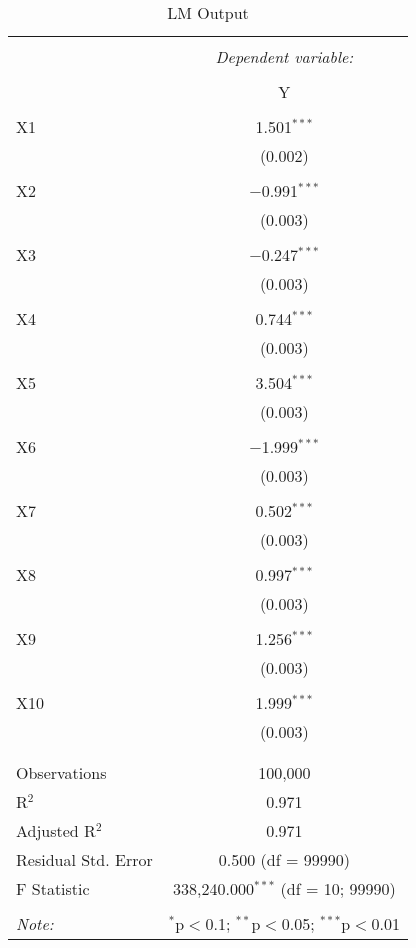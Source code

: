 \documentclass{article}
\begin{document}
\begin{table}[!htbp] \centering 
  \caption{LM Output} 
  \label{} 
\begin{tabular}{@{\extracolsep{5pt}}lc} 
\\[-1.8ex]\hline 
\hline \\[-1.8ex] 
 & \multicolumn{1}{c}{\textit{Dependent variable:}} \\ 
\cline{2-2} 
\\[-1.8ex] & Y \\ 
\hline \\[-1.8ex] 
 X1 & 1.501$^{***}$ \\ 
  & (0.002) \\ 
  & \\ 
 X2 & $-$0.991$^{***}$ \\ 
  & (0.003) \\ 
  & \\ 
 X3 & $-$0.247$^{***}$ \\ 
  & (0.003) \\ 
  & \\ 
 X4 & 0.744$^{***}$ \\ 
  & (0.003) \\ 
  & \\ 
 X5 & 3.504$^{***}$ \\ 
  & (0.003) \\ 
  & \\ 
 X6 & $-$1.999$^{***}$ \\ 
  & (0.003) \\ 
  & \\ 
 X7 & 0.502$^{***}$ \\ 
  & (0.003) \\ 
  & \\ 
 X8 & 0.997$^{***}$ \\ 
  & (0.003) \\ 
  & \\ 
 X9 & 1.256$^{***}$ \\ 
  & (0.003) \\ 
  & \\ 
 X10 & 1.999$^{***}$ \\ 
  & (0.003) \\ 
  & \\ 
\hline \\[-1.8ex] 
Observations & 100,000 \\ 
R$^{2}$ & 0.971 \\ 
Adjusted R$^{2}$ & 0.971 \\ 
Residual Std. Error & 0.500 (df = 99990) \\ 
F Statistic & 338,240.000$^{***}$ (df = 10; 99990) \\ 
\hline 
\hline \\[-1.8ex] 
\textit{Note:}  & \multicolumn{1}{r}{$^{*}$p$<$0.1; $^{**}$p$<$0.05; $^{***}$p$<$0.01} \\ 
\end{tabular} 
\end{table} 
\end{document}

